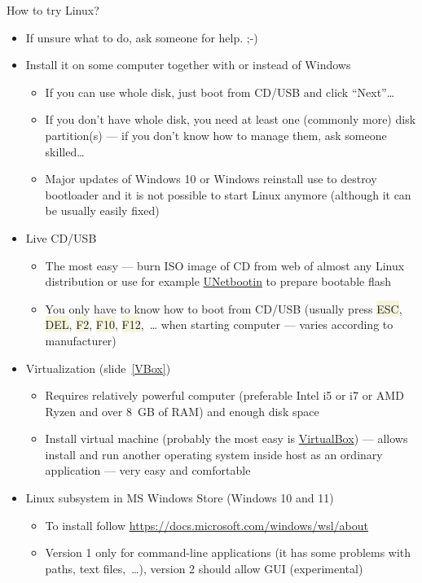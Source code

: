 \documentclass[compress, ucs, xelatex, 11pt, xcolor=svgnames, aspectratio=169,
	hyperref={
		bookmarks=true,
		unicode=true,
		colorlinks=true,
		pdftitle={Linux, command line and MetaCentrum},
		plainpages=false,
		pdfauthor={Vojtech Zeisek},
		pdfsubject={Course about use of Linux command line, writing shell scripts and using MetaCentrum of CESNET},
		pdfcreator={XeLaTeX},
		pdfkeywords={Linux, GNU, BASH, shell, command line, MetaCentrum},
		linkcolor=DarkRed, %
		anchorcolor=DarkBlue, %
		citecolor=Indigo, %
		filecolor=NavyBlue, %
		menucolor=DarkMagenta, %
		urlcolor=DarkBlue, %
		pdftex},
	url={hyphens, lowtilde} %
	]{beamer}
\renewcommand{\texttt}[1]{\colorbox{Beige}{{\ttfamily #1}}}
\begin{document}
\begin{frame}[allowframebreaks]{How to try Linux?}
	\begin{itemize}
		\item If unsure what to do, ask someone for help. ;-)
		\item Install it on some computer together with or instead of Windows
		\begin{itemize}
			\item If you can use whole disk, just boot from CD/USB and click \enquote{Next}\ldots
			\item If you don't have whole disk, you need at least one (commonly more) disk partition(s) --- if you don't know how to manage them, ask someone skilled\ldots
			\item Major updates of Windows 10 or Windows reinstall use to destroy bootloader and it is not possible to start Linux anymore (although it can be usually easily fixed)
		\end{itemize}
		\item Live CD/USB
		\begin{itemize}
			\item The most easy --- burn ISO image of CD from web of almost any Linux distribution or use for example \href{https://unetbootin.github.io/}{UNetbootin} to prepare bootable flash
			\item You only have to know how to boot from CD/USB (usually press \texttt{ESC}, \texttt{DEL}, \texttt{F2}, \texttt{F10}, \texttt{F12},~\ldots{ }when starting computer --- varies according to manufacturer)
		\end{itemize}
		\item Virtualization (slide~\ref{VBox})
		\begin{itemize}
			\item Requires relatively powerful computer (preferable Intel i5 or i7 or AMD Ryzen and over 8~GB of RAM) and enough disk space
			\item Install virtual machine (probably the most easy is \href{https://www.virtualbox.org/}{VirtualBox}) --- allows install and run another operating system inside host as an ordinary application --- very easy and comfortable
		\end{itemize}
		\item Linux subsystem in MS Windows Store (Windows 10 and 11)
		\begin{itemize}
			\item To install follow \url{https://docs.microsoft.com/windows/wsl/about}
			\item Version 1 only for command-line applications (it has some problems with paths, text files,~\ldots), version 2 should allow GUI (experimental)

\end{itemize}
\end{itemize}
\end{frame}
\end{document}
